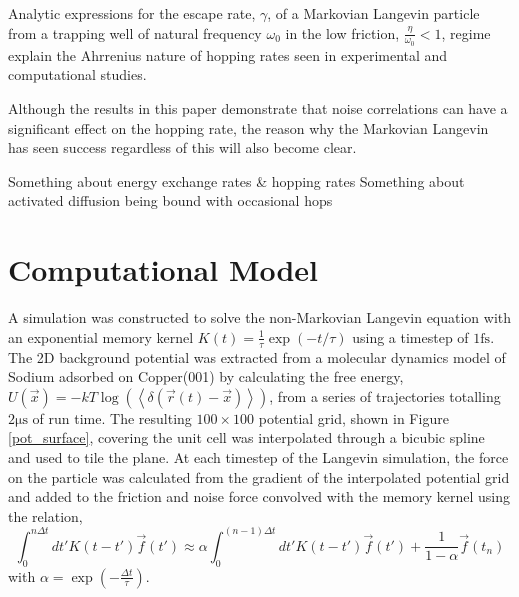 \documentclass[7pt]{article}
\newcommand{\fs}{\si{\femto\second}}
\newcommand{\us}{\si{\micro\second}}
\begin{document}
Analytic expressions for the escape rate, $\gamma$, of a Markovian Langevin particle from a trapping well of natural frequency $\omega_0$ in the low friction, $\frac{\eta}{\omega_0} < 1$, regime explain the Ahrrenius nature of hopping rates seen in experimental and computational studies. 

Although the results in this paper demonstrate that noise correlations can have a significant effect on the hopping rate, the reason why the Markovian Langevin has seen success regardless of this will also become clear.

Something about energy exchange rates \& hopping rates
Something about activated diffusion being bound with occasional hops


\section{Computational Model}

A simulation was constructed to solve the non-Markovian Langevin equation with an exponential memory kernel $K(t)=\frac{1}{\tau}\exp(-t/\tau)$ using a timestep of $1\fs$. The 2D background potential was extracted from a molecular dynamics model of Sodium adsorbed on Copper(001) by calculating the free energy, $U(\vec{x}) = - kT \log(\left< \delta(\vec{r}(t)-\vec{x}) \right>)$, from a series of trajectories totalling $2 \us$ of run time. The resulting $100\times100$ potential grid, shown in Figure \ref{pot_surface},  covering the unit cell was interpolated through a bicubic spline\cite{press1992numerical} and used to tile the plane. At each timestep of the Langevin simulation, the force on the particle was calculated from the gradient of the interpolated potential grid and added to the friction and noise force convolved with the memory kernel using the relation,
$$
\int_0^{n\Delta{t}} dt' K\left(t-t'\right) \vec{f}(t') \approx \alpha \int_0^{(n-1)\Delta{t}} dt' K\left(t-t'\right) \vec{f}(t') + \frac{1}{1-\alpha} \vec{f}\left(t_n\right)
$$
with $\alpha=\exp(-\frac{\Delta{t}}{\tau})$.



\end{document}

